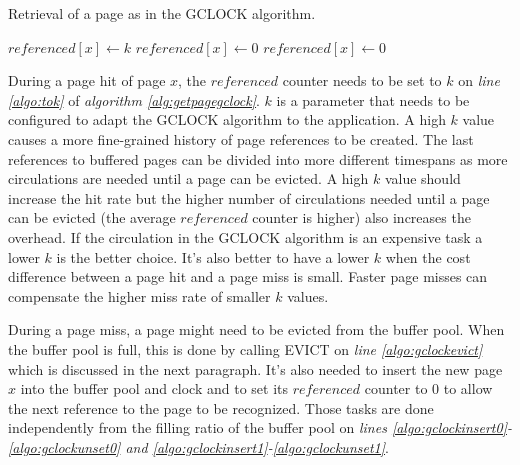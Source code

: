 \begin{@empty}
	\begin{algorithm}[ht!]
		\caption{Retrieval of a page as in the GCLOCK algorithm.}
		\label{alg:getpagegclock}
		\begin{algorithmic}[1]
					\State $referenced\left[x\right] \gets k$	\label{algo:tok}
					\State {}	\label{algo:gclockevict}
					\State {}	\label{algo:gclockinsert0}
					\State $referenced\left[x\right] \gets 0$	\label{algo:gclockunset0}
				\Else
					\State {}	\label{algo:gclockinsert1}
					\State $referenced\left[x\right] \gets 0$	\label{algo:gclockunset1}
				\EndIf
			\EndProcedure
		\end{algorithmic}
	\end{algorithm}
\end{@empty}

	During a page hit of page $x$, the $referenced$ counter needs to be set to $k$ on \emph{line \ref{algo:tok}} of \emph{algorithm \ref{alg:getpagegclock}}. $k$ is a parameter that needs to be configured to adapt the GCLOCK algorithm to the application. A high $k$ value causes a more fine-grained history of page references to be created. The last references to buffered pages can be divided into more different timespans as more circulations are needed until a page can be evicted. A high $k$ value should increase the hit rate but the higher number of circulations needed until a page can be evicted (the average $referenced$ counter is higher) also increases the overhead. If the circulation in the GCLOCK algorithm is an expensive task a lower $k$ is the better choice. It's also better to have a lower $k$ when the cost difference between a page hit and a page miss is small. Faster page misses can compensate the higher miss rate of smaller $k$ values.
	
	During a page miss, a page might need to be evicted from the buffer pool. When the buffer pool is full, this is done by calling EVICT on \emph{line \ref{algo:gclockevict}} which is discussed in the next paragraph. It's also needed to insert the new page $x$ into the buffer pool and clock and to set its $referenced$ counter to $0$ to allow the next reference to the page to be recognized. Those tasks are done independently from the filling ratio of the buffer pool on \emph{lines \ref{algo:gclockinsert0}-\ref{algo:gclockunset0} and \ref{algo:gclockinsert1}-\ref{algo:gclockunset1}}.

